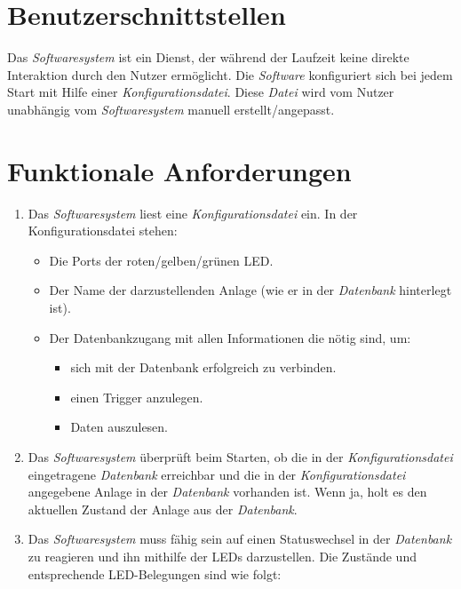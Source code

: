 \documentclass{scrartcl}
\begin{document}
\section{Benutzerschnittstellen}
Das \emph{Softwaresystem} ist ein Dienst, der während der Laufzeit keine direkte Interaktion durch den Nutzer ermöglicht. Die \emph{Software} konfiguriert sich bei jedem Start mit Hilfe einer \emph{Konfigurationsdatei}. Diese \emph{Datei} wird vom Nutzer unabhängig vom \emph{Softwaresystem} manuell erstellt/angepasst.


\section{Funktionale Anforderungen}
\begin{enumerate}[label=/FA\arabic*/]
\item Das \emph{Softwaresystem} liest eine \emph{Konfigurationsdatei} ein. In der Konfigurationsdatei stehen:
\begin{itemize}
\item Die Ports der roten/gelben/grünen LED.
\item Der Name der darzustellenden Anlage (wie er in der \emph{Datenbank} hinterlegt ist).
\item Der Datenbankzugang mit allen Informationen die nötig sind, um:
\begin{itemize}
\item sich mit der Datenbank erfolgreich zu verbinden.
\item einen Trigger anzulegen.
\item Daten auszulesen.
\end{itemize}
\end{itemize}
\item Das \emph{Softwaresystem} überprüft beim Starten, ob die in der \emph{Konfigurationsdatei} eingetragene \emph{Datenbank} erreichbar und die in der \emph{Konfigurationsdatei} angegebene Anlage in der \emph{Datenbank} vorhanden ist. Wenn ja, holt es den aktuellen Zustand der Anlage aus der \emph{Datenbank}.
\item Das \emph{Softwaresystem} muss fähig sein auf einen Statuswechsel in der \emph{Datenbank} zu reagieren und ihn mithilfe der LEDs darzustellen. Die Zustände und entsprechende LED-Belegungen sind wie folgt:\\
\begin{tabular}{l l l}

\end{tabular}
\end{enumerate}
\end{document}
